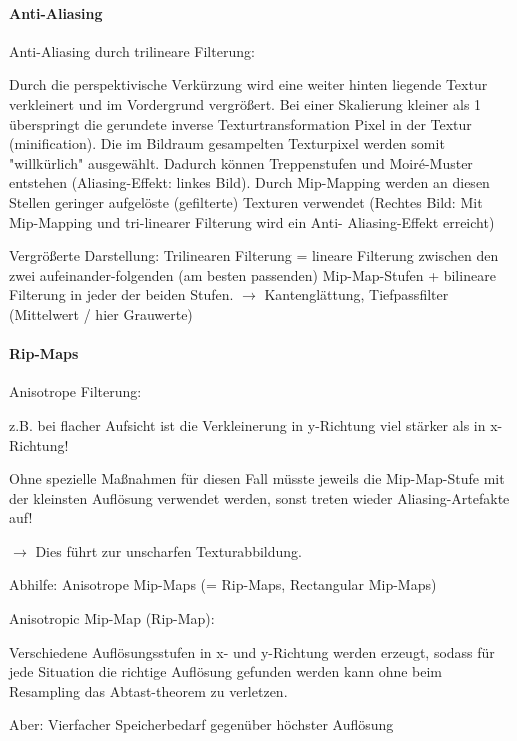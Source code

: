 \documentclass[landscape]{article}
\begin{document}
\begin{multicols}{3}
  \paragraph{Anti-Aliasing}
  Anti-Aliasing durch trilineare Filterung:
  \begin{itemize*}
    \item Durch die perspektivische Verkürzung wird eine weiter hinten liegende Textur verkleinert und im Vordergrund vergrößert. Bei einer Skalierung kleiner als 1 überspringt die gerundete inverse Texturtransformation Pixel in der Textur (minification). Die im Bildraum gesampelten Texturpixel werden somit "willkürlich" ausgewählt. Dadurch können Treppenstufen und Moiré-Muster entstehen (Aliasing-Effekt: linkes Bild). Durch Mip-Mapping werden an diesen Stellen geringer aufgelöste (gefilterte) Texturen verwendet (Rechtes Bild: Mit Mip-Mapping und tri-linearer Filterung wird ein Anti- Aliasing-Effekt erreicht)
    \item Vergrößerte Darstellung: Trilinearen Filterung = lineare Filterung zwischen den zwei aufeinander-folgenden (am besten passenden) Mip-Map-Stufen + bilineare Filterung in jeder der beiden Stufen. $\rightarrow$ Kantenglättung, Tiefpassfilter (Mittelwert / hier Grauwerte)
  \end{itemize*}
  
  
  \paragraph{Rip-Maps}
  Anisotrope Filterung: 
  \begin{itemize*}
    \item z.B. bei flacher Aufsicht ist die Verkleinerung in y-Richtung viel stärker als in x-Richtung!
    \item Ohne spezielle Maßnahmen für diesen Fall müsste jeweils die Mip-Map-Stufe mit der kleinsten Auflösung verwendet werden, sonst treten wieder Aliasing-Artefakte auf!
    \item $\rightarrow$ Dies führt zur unscharfen Texturabbildung.
    \item Abhilfe: Anisotrope Mip-Maps (= Rip-Maps, Rectangular Mip-Maps)
  \end{itemize*}
  
  Anisotropic Mip-Map (Rip-Map):
  \begin{itemize*}
    \item Verschiedene Auflösungsstufen in x- und y-Richtung werden erzeugt, sodass für jede Situation die richtige Auflösung gefunden werden kann ohne beim Resampling das Abtast-theorem zu verletzen.
    \item Aber: Vierfacher Speicherbedarf gegenüber höchster Auflösung
  \end{itemize*}
  

\end{multicols}
\end{document}
